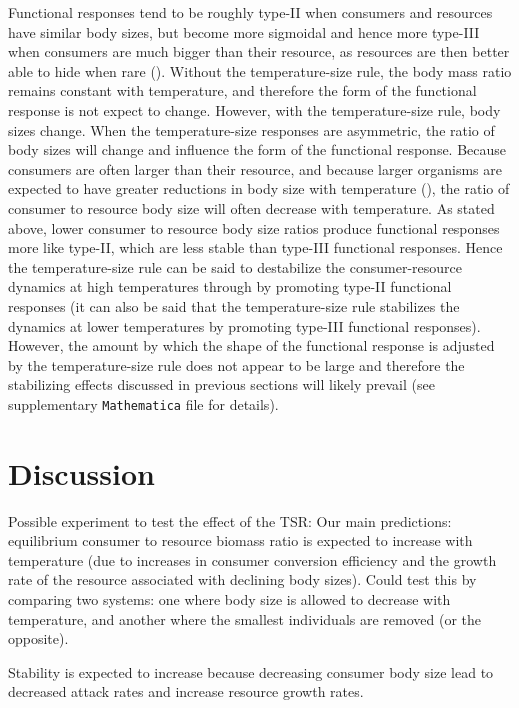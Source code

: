 \documentclass[11pt]{article}
\begin{document}
Functional responses tend to be roughly type-II when consumers and resources have similar body sizes, but become more sigmoidal and hence more type-III when consumers are much bigger than their resource, as resources are then better able to hide when rare (\cite{Kalinkat2013}).
Without the temperature-size rule, the body mass ratio remains constant with temperature, and therefore the form of the functional response is not expect to change.
However, with the temperature-size rule, body sizes change.
When the temperature-size responses are asymmetric, the ratio of body sizes will change and influence the form of the functional response.
Because consumers are often larger than their resource, and because larger organisms are expected to have greater reductions in body size with temperature (\cite{Forster2012}), the ratio of consumer to resource body size will often decrease with temperature.
As stated above, lower consumer to resource body size ratios produce functional responses more like type-II, which are less stable than type-III functional responses.
Hence the temperature-size rule can be said to destabilize the consumer-resource dynamics at high temperatures through by promoting type-II functional responses (it can also be said that the temperature-size rule stabilizes the dynamics at lower temperatures by promoting type-III functional responses).
However, the amount by which the shape of the functional response is adjusted by the temperature-size rule does not appear to be large and therefore the stabilizing effects discussed in previous sections will likely prevail (see supplementary \texttt{Mathematica} file for details). 

\section*{Discussion}

Possible experiment to test the effect of the TSR:
Our main predictions: equilibrium consumer to resource biomass ratio is expected to increase with temperature (due to increases in consumer conversion efficiency and the growth rate of the resource associated with declining body sizes). Could test this by comparing two systems: one where body size is allowed to decrease with temperature, and another where the smallest individuals are removed (or the opposite). 

Stability is expected to increase because decreasing consumer body size lead to decreased attack rates and increase resource growth rates.
\end{document}
